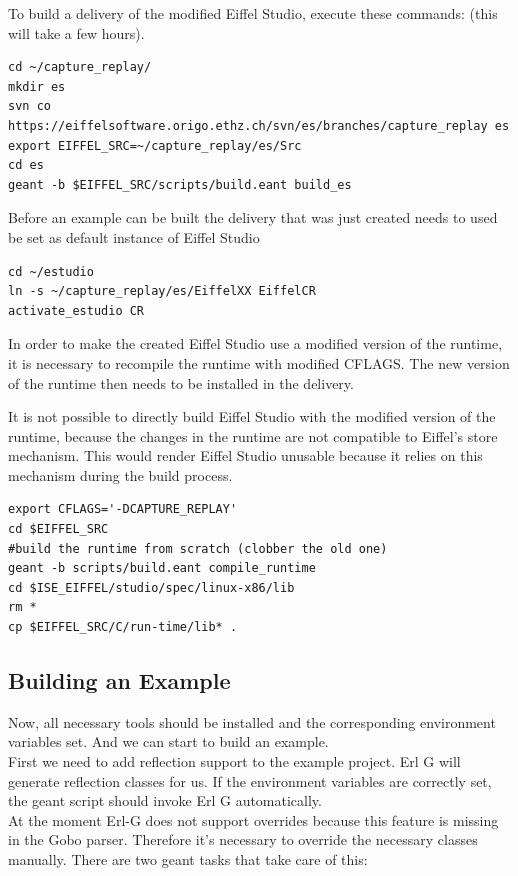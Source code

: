 To build a delivery of the modified Eiffel Studio, execute these commands: (this will take a few hours).
\begin{lstlisting}
cd ~/capture_replay/
mkdir es
svn co https://eiffelsoftware.origo.ethz.ch/svn/es/branches/capture_replay es
export EIFFEL_SRC=~/capture_replay/es/Src
cd es
geant -b $EIFFEL_SRC/scripts/build.eant build_es
\end{lstlisting}

Before an example can be built the delivery that was just created needs to used be set as default instance of Eiffel Studio
\begin{lstlisting}
cd ~/estudio
ln -s ~/capture_replay/es/EiffelXX EiffelCR
activate_estudio CR
\end{lstlisting}

In order to make the created Eiffel Studio use a modified version of the runtime, it is necessary to recompile the runtime with modified CFLAGS. The new version of the runtime then needs to be installed in the delivery.

It is not possible to directly build Eiffel Studio with the modified version of the runtime, because the changes in the runtime are not compatible to Eiffel's store mechanism. This would render Eiffel Studio unusable because it relies on this mechanism during the build process.
\begin{lstlisting}
export CFLAGS='-DCAPTURE_REPLAY' 
cd $EIFFEL_SRC
#build the runtime from scratch (clobber the old one)
geant -b scripts/build.eant compile_runtime
cd $ISE_EIFFEL/studio/spec/linux-x86/lib
rm *
cp $EIFFEL_SRC/C/run-time/lib* .
\end{lstlisting}


\subsection{Building an Example}
Now, all necessary tools should be installed and the corresponding environment variables set. And we can start to build an example.\\
First we need to add reflection support to the example project. Erl G will generate reflection classes for us. If the environment variables are correctly set, the geant script should invoke Erl G automatically. \\
At the moment Erl-G does not support overrides because this feature is missing in the Gobo parser. Therefore it's necessary to override the necessary classes manually. There are two geant tasks that take care of this:

